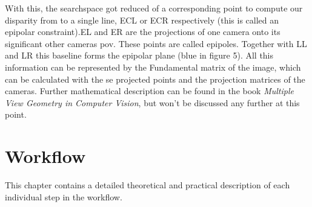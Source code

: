 \documentclass[journal,onecolumn]{IEEEtran}
\begin{document}
With this, the searchspace got reduced of a corresponding point to compute our disparity from to a single line, ECL or ECR respectively (this is called an epipolar constraint).EL and ER are the projections of one camera onto its significant other cameras pov. These points are called epipoles. Together with LL and LR this baseline forms the epipolar plane (blue in figure 5). All this information can be represented by the Fundamental matrix of the image, which can be calculated with the se projected points and the projection matrices of the cameras. Further mathematical description can be found in the book \emph{Multiple View Geometry in Computer Vision}\cite{hartley_zisserman_2004}, but won't be discussed any further at this point.
\section{Workflow}
\noindent
This chapter contains a detailed theoretical and practical description of each individual step in the workflow.
\end{document}
